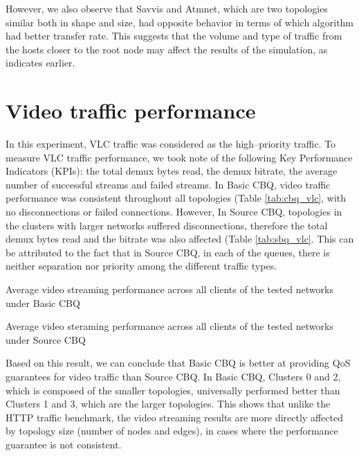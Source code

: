 However, we also observe that Savvis and Atmnet, which are two topologies similar both in shape and size, had opposite behavior in terms of which algorithm had better transfer rate. This suggests that the volume and type of traffic from the hosts closer to the root node may affect the results of the simulation, as indicates earlier.

\section{Video traffic performance}
In this experiment, VLC traffic was considered as the high--priority traffic. To measure VLC traffic performance, we took note of the following Key Performance Indicators (KPIs): the total demux bytes read, the demux bitrate, the average number of successful streams and failed streams. In Basic CBQ, video traffic performance was consistent throughout all topologies (Table \ref{tab:cbq_vlc}, with no disconnections or failed connections. However, In Source CBQ, topologies in the clusters with larger networks suffered disconnections, therefore the total demux bytes read and the bitrate was also affected (Table \ref{tab:sbq_vlc}. This can be attributed to the fact that in Source CBQ, in each of the queues, there is neither separation nor priority among the different traffic types.

\begin{table}[htbp]
    \caption{Average video streaming performance across all clients of the tested networks under Basic CBQ}
    \centering
    
    \label{tab:cbq_vlc}
\end{table}

\begin{table}[htbp]
    \caption{Average video steraming performance across all clients of the tested networks under Source CBQ}
    \centering
    
    \label{tab:sbq_vlc}
\end{table}

Based on this result, we can conclude that Basic CBQ is better at providing QoS guarantees for video traffic than Source CBQ. In Basic CBQ, Clusters 0 and 2, which is composed of the smaller topologies, universally performed better than Clusters 1 and 3, which are the larger topologies. This shows that unlike the HTTP traffic benchmark, the video streaming results are more directly affected by topology size (number of nodes and edges), in cases where the performance guarantee is not consistent.

